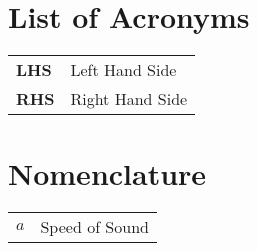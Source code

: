 \section*{List of Acronyms}

    \begin{table}[H]
		\begin{tabular}{m{3cm} m{12cm}} 
		    \textbf{LHS} & Left Hand Side\\
		    \textbf{RHS} & Right Hand Side\\
		\end{tabular}
	\end{table}

\section*{Nomenclature}

    \begin{table}[H]
        \begin{tabular}{m{3cm} m{12cm}}
            $a$ & Speed of Sound \\
        \end{tabular}
    \end{table}
			
			
		